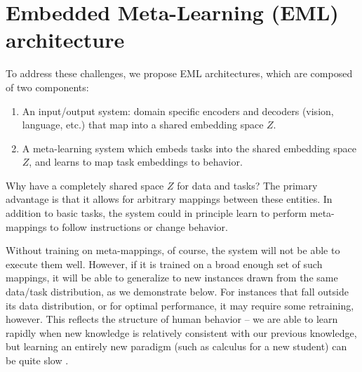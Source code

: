 \documentclass{article}
\begin{document}
\section{Embedded Meta-Learning (EML) architecture}
\vspace{-0.5em} %
To address these challenges, we propose EML architectures, which are composed of two components: 
\vspace{-1em}
\begin{enumerate} \setlength \itemsep{0em}
\item An input/output system: domain specific encoders and decoders (vision, language, etc.) that map into a shared embedding space $Z$.
\item A meta-learning system which embeds tasks into the shared embedding space $Z$, and learns to map task embeddings to behavior.
\end{enumerate}
\vspace{-0.75em}
Why have a completely shared space $Z$ for data and tasks? The primary advantage is that it allows for arbitrary mappings between these entities. In addition to basic tasks, the system could in principle learn to perform meta-mappings to follow instructions or change behavior. \par
Without training on meta-mappings, of course, the system will not be able to execute them well. However, if it is trained on a broad enough set of such mappings, it will be able to generalize to new instances drawn from the same data/task distribution, as we demonstrate below. For instances that fall outside its data distribution, or for optimal performance, it may require some retraining, however. This reflects the structure of human behavior -- we are able to learn rapidly when new knowledge is relatively consistent with our previous knowledge, but learning an entirely new paradigm (such as calculus for a new student) can be quite slow \citep[cf.][]{Kumaran2016, Botvinick2019}. \par 
\end{document}
